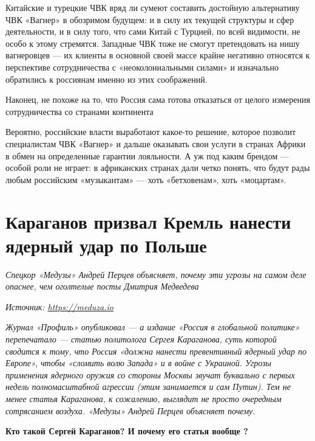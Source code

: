 Китайские и турецкие ЧВК вряд ли сумеют составить достойную альтернативу ЧВК «Вагнер» в обозримом будущем: и в силу их текущей структуры и сфер деятельности, и в силу того, что сами Китай с Турцией, по всей видимости, не особо к этому стремятся. Западные ЧВК тоже не смогут претендовать на нишу вагнеровцев — их клиенты в основной своей массе крайне негативно относятся к перспективе сотрудничества с «неоколониальными силами» и изначально обратились к россиянам именно из этих соображений.

\begin{center}
    \Large
    Наконец, не похоже на то, что Россия сама готова отказаться от целого измерения сотрудничества со странами континента
\end{center}

Вероятно, российские власти выработают какое-то решение, которое позволит специалистам ЧВК «Вагнер» и дальше оказывать свои услуги в странах Африки в обмен на определенные гарантии лояльности. А уж под каким брендом — особой роли не играет: в африканских странах дали четко понять, что будут рады любым российским «музыкантам» — хоть «бетховенам», хоть «моцартам».

\newpage
\section{Караганов призвал Кремль нанести ядерный удар по Польше}

\textit{Спецкор «Медузы» Андрей Перцев объясняет, почему эти угрозы на самом деле опаснее, чем оголтелые посты Дмитрия Медведева}

\textit{Источник: \url{https://meduza.io}}

\textit{Журнал «Профиль» опубликовал — а издание «Россия в глобальной политике» перепечатало — статью политолога Сергея Караганова, суть которой сводится к тому, что Россия «должна нанести превентивный ядерный удар по Европе», чтобы «сломить волю Запада» и  в войне с Украиной. Угрозы применения ядерного оружия со стороны Москвы звучат буквально с первых недель полномасштабной агрессии (этим занимается и сам Путин). Тем не менее статья Караганова, к сожалению, выглядит не просто очередным сотрясанием воздуха.  «Медузы» Андрей Перцев объясняет почему.
}

\textbf{Кто такой Сергей Караганов? И почему его статья вообще ?}

